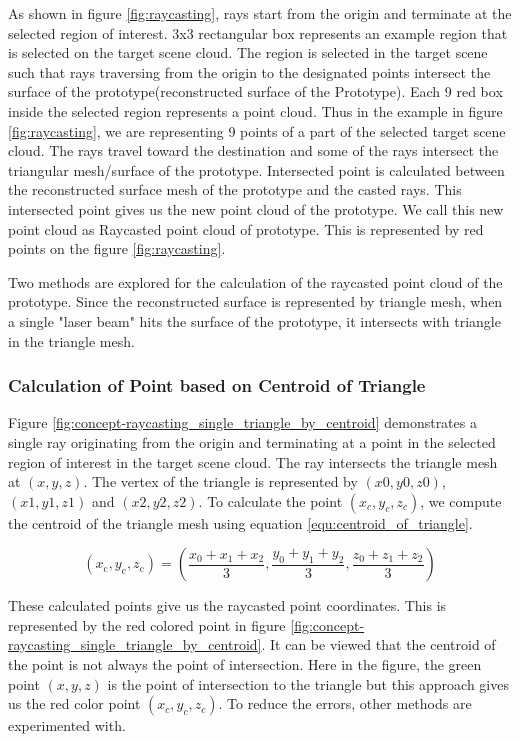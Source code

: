 As shown in figure \ref{fig:raycasting}, rays start from the origin and terminate at the selected region of interest. 3x3 rectangular box represents an example region that is selected on the target scene cloud. The region is selected in the target scene such that rays traversing from the origin to the designated points intersect the surface of the prototype(reconstructed surface of the Prototype).
Each 9 red box inside the selected region represents a point cloud. Thus in the example in figure \ref{fig:raycasting}, we are representing 9 points of a part of the selected target scene cloud. The rays travel toward the destination and some of the rays intersect the triangular mesh/surface of the prototype. Intersected point is calculated between the reconstructed surface mesh of the prototype and the casted rays. This intersected point gives us the new point cloud of the prototype. We call this new point cloud as Raycasted point cloud of prototype. This is represented by red points on the figure \ref{fig:raycasting}.

Two methods are explored for the calculation of the raycasted point cloud of the prototype. Since the reconstructed surface is represented by triangle mesh, when a single "laser beam" hits the surface of the prototype, it intersects with triangle in the triangle mesh. 

\subsubsection{Calculation of Point based on Centroid of Triangle}

Figure \ref{fig:concept-raycasting_single_triangle_by_centroid} demonstrates a single ray originating from the origin and terminating at a point in the selected region of interest in the target scene cloud. The ray intersects the triangle mesh at \((x, y, z)\). The vertex of the triangle is represented by \((x0, y0, z0)\), \((x1, y1, z1)\) and \((x2, y2, z2)\). To calculate the point \((x_c, y_c, z_c)\), we compute the centroid of the triangle mesh using equation \ref{equ:centroid_of_triangle}.

\begin{equation}
    (x_{\text{c}}, y_{\text{c}}, z_{\text{c}}) = \left( \frac{x_0 + x_1 + x_2}{3}, \frac{y_0 + y_1 + y_2}{3}, \frac{z_0 + z_1 + z_2}{3} \right)
    \label{equ:centroid_of_triangle}
\end{equation}


These calculated points give us the raycasted point coordinates. This is represented by the red colored point in figure \ref{fig:concept-raycasting_single_triangle_by_centroid}. It can be viewed that the centroid of the point is not always the point of intersection. Here in the figure, the green point \((x, y, z)\) is the point of intersection to the triangle but this approach gives us the red color point \((x_c, y_c, z_c)\). To reduce the errors, other methods are experimented with.

